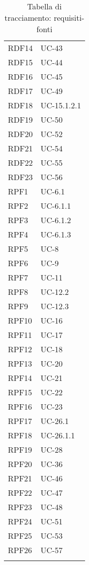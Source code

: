 \begin{longtable}{| p{5cm} | p{5cm} |}
		\rowcolor{LightGray}
		RDF14 & UC-43\\
		RDF15 & UC-44\\
		\rowcolor{LightGray}
		RDF16 & UC-45\\
		RDF17 & UC-49 \\
		\rowcolor{LightGray}
		RDF18 & UC-15.1.2.1 \\
		RDF19 & UC-50 \\
		\rowcolor{LightGray}
		RDF20 & UC-52 \\
		RDF21 & UC-54 \\
		\rowcolor{LightGray}
		RDF22 & UC-55 \\
		RDF23 & UC-56 \\
		\rowcolor{LightGray}
		RPF1 & UC-6.1\\
		RPF2 & UC-6.1.1\\
		\rowcolor{LightGray}
		RPF3 & UC-6.1.2\\
		RPF4 & UC-6.1.3\\
		\rowcolor{LightGray}
		RPF5 & UC-8\\
		RPF6 & UC-9\\
		\rowcolor{LightGray}
		RPF7 & UC-11\\
		RPF8 & UC-12.2\\
		\rowcolor{LightGray}
		RPF9 & UC-12.3\\
		RPF10 & UC-16\\
		\rowcolor{LightGray}
		RPF11 & UC-17\\
		RPF12 & UC-18\\
		\rowcolor{LightGray}
		RPF13 & UC-20\\
		RPF14 & UC-21\\
		\rowcolor{LightGray}
		RPF15 & UC-22\\
		RPF16 & UC-23\\
		\rowcolor{LightGray}
		RPF17 & UC-26.1\\
		RPF18 & UC-26.1.1\\
		\rowcolor{LightGray}
		RPF19 & UC-28\\
		RPF20 & UC-36\\
		\rowcolor{LightGray}
		RPF21 & UC-46\\
		RPF22 & UC-47\\
		\rowcolor{LightGray}
		RPF23 & UC-48\\
		RPF24 & UC-51\\
		\rowcolor{LightGray}
		RPF25 & UC-53\\
		RPF26 & UC-57\\	
		\rowcolor{LightGray}
		\hline
		\caption{Tabella di tracciamento: requisiti-fonti}
\end{longtable}

